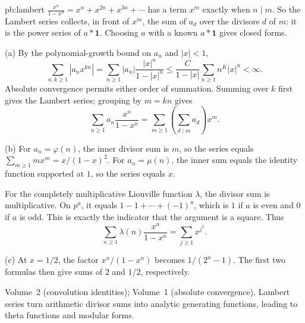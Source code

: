 \begin{solution}{pb:lambert}
\idea $\frac{x^n}{1-x^n}=x^n+x^{2n}+x^{3n}+\cdots$ has a term $x^m$ exactly when $n\mid m$. So the Lambert series collects, in
front of $x^m$, the sum of $a_d$ over the divisors $d$ of $m$: it is the power series of $a*\mathbf1$. Choosing $a$ with a
known $a*\mathbf1$ gives closed forms.

\writeup (a) By the polynomial-growth bound on $a_n$ and $|x|<1$,
\[
\sum_{n,k\ge1}|a_nx^{kn}|
=\sum_{n\ge1}|a_n|\frac{|x|^n}{1-|x|^n}
\le\frac C{1-|x|}\sum_{n\ge1}n^K|x|^n<\infty.
\]
Absolute convergence permits either order of summation. Summing over $k$ first gives the Lambert series; grouping by $m=kn$ gives
\[
\sum_{n\ge1}a_n\frac{x^n}{1-x^n}
=\sum_{m\ge1}\left(\sum_{d\mid m}a_d\right)x^m.
\]

(b) For $a_n=\varphi(n)$, the inner divisor sum is $m$, so the series equals $\sum_{m\ge1}mx^m=x/(1-x)^2$. For $a_n=\mu(n)$, the inner sum equals the identity function supported at $1$, so the series equals $x$.

For the completely multiplicative Liouville function $\lambda$, the divisor sum is multiplicative. On $p^a$, it equals $1-1+\cdots+(-1)^a$, which is $1$ if $a$ is even and $0$ if $a$ is odd. This is exactly the indicator that the argument is a square. Thus
\[
\sum_{n\ge1}\lambda(n)\frac{x^n}{1-x^n}
=\sum_{j\ge1}x^{j^2}.
\]

(c) At $x=1/2$, the factor $x^n/(1-x^n)$ becomes $1/(2^n-1)$. The first two formulas then give sums of $2$ and $1/2$, respectively.

\tools Volume~2 (convolution identities); Volume~1 (absolute convergence).
\leads Lambert series turn arithmetic divisor sums into analytic generating functions, leading to theta functions and modular forms.
\end{solution}

